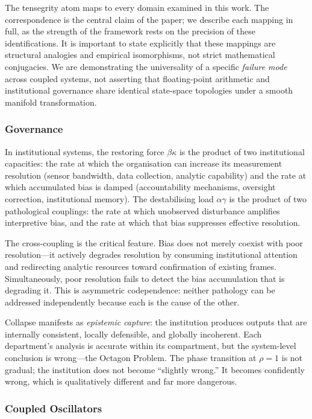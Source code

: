 \documentclass[10pt,twocolumn]{article}
\theoremstyle{definition}
\theoremstyle{remark}
\begin{document}
The tensegrity atom maps to every domain examined in this work.  The correspondence is the central claim of the paper; we describe each mapping in full, as the strength of the framework rests on the precision of these identifications.  It is important to state explicitly that these mappings are structural analogies and empirical isomorphisms, not strict mathematical conjugacies.  We are demonstrating the universality of a specific \emph{failure mode} across coupled systems, not asserting that floating-point arithmetic and institutional governance share identical state-space topologies under a smooth manifold transformation.

\subsubsection{Governance}

In institutional systems, the restoring force $\beta\kappa$ is the product of two institutional capacities: the rate at which the organisation can increase its measurement resolution (sensor bandwidth, data collection, analytic capability) and the rate at which accumulated bias is damped (accountability mechanisms, oversight correction, institutional memory).  The destabilising load $\alpha\gamma$ is the product of two pathological couplings: the rate at which unobserved disturbance amplifies interpretive bias, and the rate at which that bias suppresses effective resolution.

The cross-coupling is the critical feature.  Bias does not merely coexist with poor resolution---it actively degrades resolution by consuming institutional attention and redirecting analytic resources toward confirmation of existing frames.  Simultaneously, poor resolution fails to detect the bias accumulation that is degrading it.  This is asymmetric codependence: neither pathology can be addressed independently because each is the cause of the other.

Collapse manifests as \emph{epistemic capture}: the institution produces outputs that are internally consistent, locally defensible, and globally incoherent.  Each department's analysis is accurate within its compartment, but the system-level conclusion is wrong---the Octagon Problem.  The phase transition at $\rho = 1$ is not gradual; the institution does not become ``slightly wrong.''  It becomes confidently wrong, which is qualitatively different and far more dangerous.

\subsubsection{Coupled Oscillators}
\end{document}
